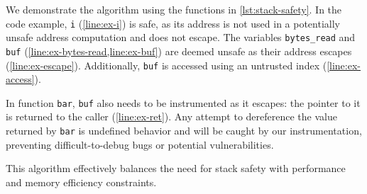 We demonstrate the algorithm using the functions in \cref{lst:stack-safety}.
In the code example, \texttt{i} (\cref{line:ex-i}) is safe, as its address is not used in a potentially unsafe address computation and does not escape.
The variables \texttt{bytes\_read} and \texttt{buf} (\cref{line:ex-bytes-read,line:ex-buf}) are deemed unsafe as their address escapes (\cref{line:ex-escape}).
Additionally, \texttt{buf} is accessed using an untrusted index (\cref{line:ex-access}).

\noindent
In function \texttt{bar}, \texttt{buf} also needs to be instrumented as it escapes: the pointer to it is returned to the caller (\cref{line:ex-ret}).
Any attempt to dereference the value returned by \texttt{bar} is undefined behavior and will be caught by our instrumentation, preventing difficult-to-debug bugs or potential vulnerabilities.

\noindent
This algorithm effectively balances the need for stack safety with performance and memory efficiency constraints.
